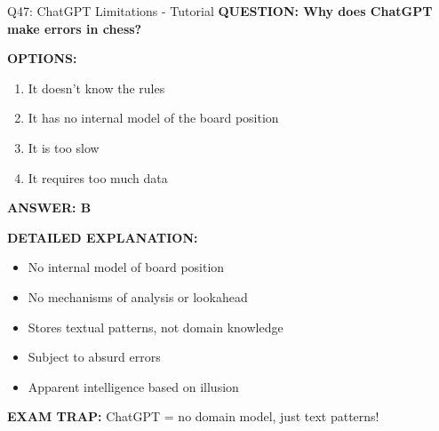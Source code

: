 \documentclass[8pt]{beamer}
\begin{document}
	\begin{frame}{Q47: ChatGPT Limitations - Tutorial}
		\fontsize{6.5}{7.5}\selectfont
		\textbf{QUESTION: Why does ChatGPT make errors in chess?}
		
		\vspace{0.1cm}
		\textbf{OPTIONS:}
		\begin{enumerate}
			\item It doesn't know the rules
			\item It has no internal model of the board position
			\item It is too slow
			\item It requires too much data
		\end{enumerate}
		
		\vspace{0.1cm}
		\textcolor{myblue}{\textbf{ANSWER: B}}
		
		\vspace{0.1cm}
		\textbf{DETAILED EXPLANATION:}
		\begin{itemize}
			\item No internal model of board position
			\item No mechanisms of analysis or lookahead
			\item Stores textual patterns, not domain knowledge
			\item Subject to absurd errors
			\item Apparent intelligence based on illusion
		\end{itemize}
		
		\vspace{0.1cm}
		\textcolor{myred}{\textbf{EXAM TRAP:}} ChatGPT = \textcolor{myblue}{no domain model, just text patterns}!
	\end{frame}
	
\end{document}
